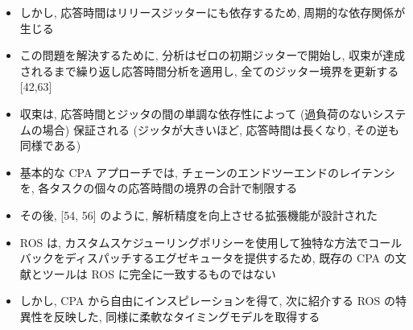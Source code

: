 \begin{frame}{}
    \begin{itemize}
        \item しかし, 応答時間はリリースジッターにも依存するため, 周期的な依存関係が生じる
        \item この問題を解決するために, 分析はゼロの初期ジッターで開始し, 収束が達成されるまで繰り返し応答時間分析を適用し, 全てのジッター境界を更新する [42,63]
        \item 収束は, 応答時間とジッタの間の単調な依存性によって (過負荷のないシステムの場合) 保証される (ジッタが大きいほど, 応答時間は長くなり, その逆も同様である)
        \item 基本的な CPA アプローチでは, チェーンのエンドツーエンドのレイテンシを, 各タスクの個々の応答時間の境界の合計で制限する
        \item その後, [54, 56] のように, 解析精度を向上させる拡張機能が設計された
    \end{itemize}
\end{frame}

\begin{frame}{}
    \begin{itemize}
        \item ROS は, カスタムスケジューリングポリシーを使用して独特な方法でコールバックをディスパッチするエグゼキュータを提供するため, 既存の CPA の文献とツールは ROS に完全に一致するものではない
        \item しかし, CPA から自由にインスピレーションを得て, 次に紹介する ROS の特異性を反映した, 同様に柔軟なタイミングモデルを取得する
    \end{itemize}
\end{frame}
